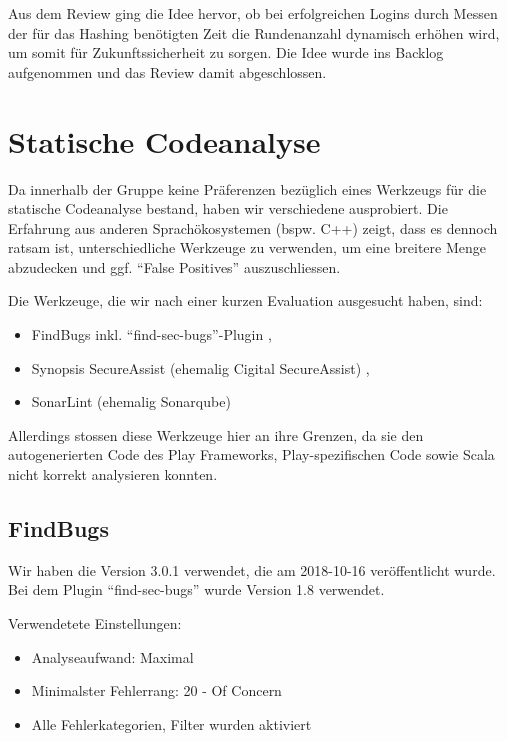 \documentclass[12pt,DIV14,BCOR10mm,a4paper,twoside,parskip=half-,headsepline,headinclude,english,ngerman,bibliography=totocnumbered]{scrreprt}
\begin{document}
Aus dem Review ging die Idee hervor, ob bei erfolgreichen Logins durch Messen der für das Hashing benötigten Zeit die Rundenanzahl dynamisch erhöhen wird, um somit für Zukunftssicherheit zu sorgen. Die Idee wurde ins Backlog aufgenommen und das Review damit abgeschlossen.

\section{Statische Codeanalyse}

Da innerhalb der Gruppe keine Präferenzen bezüglich eines Werkzeugs für die statische Codeanalyse bestand, haben wir verschiedene ausprobiert.
Die Erfahrung aus anderen Sprachökosystemen (bspw. C++) zeigt, dass es dennoch ratsam ist, unterschiedliche Werkzeuge zu verwenden, um eine breitere Menge abzudecken und ggf. \enquote{False Positives} auszuschliessen.

Die Werkzeuge, die wir nach einer kurzen Evaluation ausgesucht haben, sind:

\begin{itemize}
  \item FindBugs \autocite{FindBugs} inkl. \enquote{find-sec-bugs}-Plugin \autocite{FindBugs.FindSecBugs},
  \item Synopsis SecureAssist (ehemalig Cigital SecureAssist) \autocite{SecureAssist},
  \item SonarLint (ehemalig Sonarqube) \autocite{SonarLint}
\end{itemize}

Allerdings stossen diese Werkzeuge hier an ihre Grenzen, da sie den autogenerierten Code des Play Frameworks, Play-spezifischen Code sowie Scala nicht korrekt analysieren konnten.

\subsection{FindBugs}

Wir haben die Version 3.0.1 verwendet, die am 2018-10-16 veröffentlicht wurde.
Bei dem Plugin \enquote{find-sec-bugs} wurde Version 1.8 verwendet.

Verwendetete Einstellungen:

\begin{itemize}
  \item Analyseaufwand: Maximal
  \item Minimalster Fehlerrang: 20 - Of Concern
  \item Alle Fehlerkategorien, Filter wurden aktiviert
\end{itemize}
\end{document}
